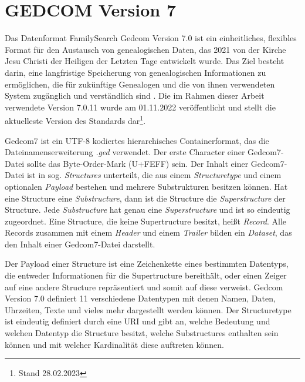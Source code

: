 \section{GEDCOM Version 7}
{
\label{sec: GEDCOM Version 7}
Das Datenformat FamilySearch Gedcom Version 7.0 ist ein einheitliches, flexibles Format für den Austausch von genealogischen Daten, das 2021 von der Kirche Jesu Christi der Heiligen der Letzten Tage entwickelt wurde. Das Ziel besteht darin, eine langfristige Speicherung von genealogischen Informationen zu ermöglichen, die für zukünftige Genealogen und die von ihnen verwendeten System zugänglich und verständlich sind \cite{GEDCOM}. Die im Rahmen dieser Arbeit verwendete Version 7.0.11 wurde am 01.11.2022 veröffentlicht und stellt die aktuelleste Version des Standards dar\footnote{Stand 28.02.2023}. 

Gedcom7 ist ein UTF-8 kodiertes hierarchisches Containerformat, das die Dateinamenserweiterung \textit{.ged} verwendet. Der erste Character einer Gedcom7-Datei sollte das Byte-Order-Mark (U+FEFF) sein. Der Inhalt einer Gedcom7-Datei ist in sog. \textit{Structures} unterteilt, die aus einem \textit{Structuretype} und einem optionalen \textit{Payload} bestehen und mehrere Substrukturen besitzen können. Hat eine Structure eine \textit{Substructure}, dann ist die Structure die \textit{Superstructure} der Structure. Jede \textit{Substructure} hat genau eine \textit{Superstructure} und ist so eindeutig zugeordnet. Eine Structure, die keine Supertructure besitzt, heißt \textit{Record}. Alle Records zusammen mit einem \textit{Header} und einem \textit{Trailer} bilden ein \textit{Dataset}, das den Inhalt einer Gedcom7-Datei darstellt. \cite{GEDCOM} 

Der Payload einer Structure ist eine Zeichenkette eines bestimmten Datentyps, die entweder Informationen für die Supertructure bereithält, oder einen Zeiger auf eine andere Structure repräsentiert und somit auf diese verweist. Gedcom Version 7.0 definiert 11 verschiedene Datentypen mit denen Namen, Daten, Uhrzeiten, Texte und vieles mehr dargestellt werden können. Der Structuretype ist eindeutig definiert durch eine URI und gibt an, welche Bedeutung und welchen Datentyp die Structure besitzt, welche Substructures enthalten sein können und mit welcher Kardinalität diese auftreten können. \cite{GEDCOM} 

}
